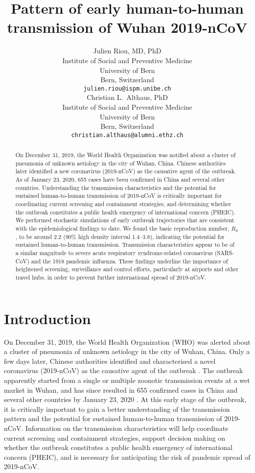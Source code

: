 \documentclass{article}
\title{Pattern of early human-to-human transmission of Wuhan 2019-nCoV}
\author{
   Julien Riou, MD, PhD \\
  Institute of Social and Preventive Medicine\\
  University of Bern\\
  Bern, Switzerland \\
  \texttt{julien.riou@ispm.unibe.ch} \\
  \And
Christian L.~Althaus, PhD \\
Institute of Social and Preventive Medicine\\
University of Bern\\
Bern, Switzerland \\
\texttt{christian.althaus@alumni.ethz.ch}
}
\begin{document}
\maketitle

\begin{abstract}
On December 31, 2019, the World Health Organization was notified about a cluster of pneumonia of unknown aetiology in the city of Wuhan, China. Chinese authorities later identified a new coronavirus (2019-nCoV) as the causative agent of the outbreak. As of January 23, 2020, 655 cases have been confirmed in China and several other countries. Understanding the transmission characteristics and the potential for sustained human-to-human transmission of 2019-nCoV is critically important for coordinating current screening and containment strategies, and determining whether the outbreak constitutes a public health emergency of international concern (PHEIC). We performed stochastic simulations of early outbreak trajectories that are consistent with the epidemiological findings to date. We found the basic reproduction number, $R_0$, to be around 2.2 (90\% high density interval 1.4--3.8), indicating the potential for sustained human-to-human transmission. Transmission characteristics appear to be of a similar magnitude to severe acute respiratory syndrome-related coronavirus (SARS-CoV) and the 1918 pandemic influenza. These findings underline the importance of heightened screening, surveillance and control efforts, particularly at airports and other travel hubs, in order to prevent further international spread of 2019-nCoV.
\end{abstract}

\section*{Introduction}

On December 31, 2019, the World Health Organization (WHO) was alerted about a cluster of pneumonia of unknown aetiology in the city of Wuhan, China\cite{who1}. Only a few days later, Chinese authorities identified and characterised a novel coronavirus (2019-nCoV) as the causative agent of the outbreak \cite{Shi:2020}. The outbreak apparently started from a single or multiple zoonotic transmission events at a wet market in Wuhan, and has since resulted in 655 confirmed cases in China and several other countries by January 23, 2020 \cite{wiki}. At this early stage of the outbreak, it is critically important to gain a better understanding of the transmission pattern and the potential for sustained human-to-human transmission of 2019-nCoV. Information on the transmission characteristics will help coordinate current screening and containment strategies, support decision making on whether the outbreak constitutes a public health emergency of international concern (PHEIC), and is necessary for anticipating the risk of pandemic spread of 2019-nCoV.
\end{document}
